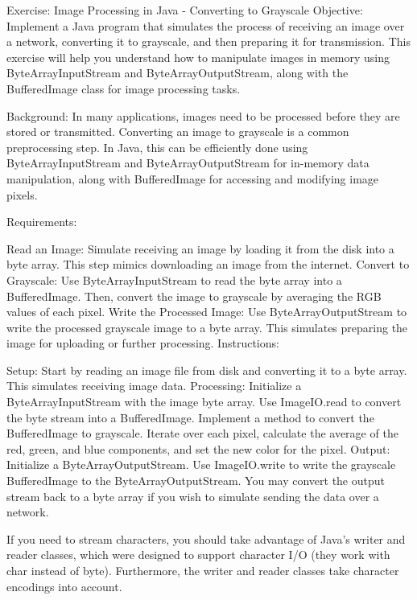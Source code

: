 \begin{oefening}
Exercise: Image Processing in Java - Converting to Grayscale
Objective: Implement a Java program that simulates the process of receiving an image over a network, converting it to grayscale, and then preparing it for transmission. This exercise will help you understand how to manipulate images in memory using ByteArrayInputStream and ByteArrayOutputStream, along with the BufferedImage class for image processing tasks.

Background: In many applications, images need to be processed before they are stored or transmitted. Converting an image to grayscale is a common preprocessing step. In Java, this can be efficiently done using ByteArrayInputStream and ByteArrayOutputStream for in-memory data manipulation, along with BufferedImage for accessing and modifying image pixels.

Requirements:

Read an Image: Simulate receiving an image by loading it from the disk into a byte array. This step mimics downloading an image from the internet.
Convert to Grayscale: Use ByteArrayInputStream to read the byte array into a BufferedImage. Then, convert the image to grayscale by averaging the RGB values of each pixel.
Write the Processed Image: Use ByteArrayOutputStream to write the processed grayscale image to a byte array. This simulates preparing the image for uploading or further processing.
Instructions:

Setup: Start by reading an image file from disk and converting it to a byte array. This simulates receiving image data.
Processing:
Initialize a ByteArrayInputStream with the image byte array.
Use ImageIO.read to convert the byte stream into a BufferedImage.
Implement a method to convert the BufferedImage to grayscale. Iterate over each pixel, calculate the average of the red, green, and blue components, and set the new color for the pixel.
Output:
Initialize a ByteArrayOutputStream.
Use ImageIO.write to write the grayscale BufferedImage to the ByteArrayOutputStream.
You may convert the output stream back to a byte array if you wish to simulate sending the data over a network.
\end{oefening}



If you need to stream characters, you should take advantage of Java’s writer and reader classes, which were designed to support character I/O (they work with char instead of byte). Furthermore, the writer and reader classes take character encodings into account.



